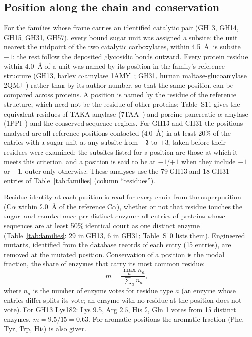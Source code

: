 \documentclass[preprint,12pt]{elsarticle}
\begin{document}
\subsection{Position along the chain and conservation}\label{sec:position}
For the families whose frame carries an identified catalytic pair (GH13, GH14, GH15, GH31, GH57), every bound sugar
unit was assigned a subsite: the unit nearest the midpoint of the two catalytic carboxylates,
within 4.5~\AA, is subsite $-1$; the rest follow the deposited glycosidic bonds outward.
Every protein residue within 4.0~\AA{} of a unit was named by its position in the
family's reference structure (GH13, barley $\alpha$-amylase 1AMY~\citep{Kadziola1994}; GH31, human
maltase-glucoamylase 2QMJ~\citep{Sim2008}) rather than by its author number, so that the same position can be
compared across proteins. A position is named by the residue of the reference structure, which need not be the
residue of other proteins; Table~S11 gives the equivalent residues of TAKA-amylase (7TAA~\citep{Brzozowski1997}) and porcine pancreatic $\alpha$-amylase (1PPI~\citep{Qian1994}) and the conserved sequence regions. For GH13 and GH31 the
positions analysed are all reference positions contacted (4.0~\AA) in at least 20\% of the entries with a sugar unit
at any subsite from $-3$ to $+3$, taken before their residues were examined; the subsites listed for a position are
those at which it meets this criterion, and a position is said to be at $-1$/$+1$ when they include $-1$ or $+1$,
outer-only otherwise. These analyses use the 79 GH13 and 18 GH31 entries of Table~\ref{tab:families} (column ``residues'').

Residue identity at each position is read for every chain from the superposition (C$\alpha$
within 2.0~\AA{} of the reference C$\alpha$), whether or not that residue touches the sugar, and counted once per
distinct enzyme: all entries of proteins whose sequences are at least 50\% identical count as one distinct enzyme (Table~\ref{tab:families}: 29 in GH13, 6 in GH31; Table~S10 lists them). Engineered mutants, identified from the
database records of each entry (15 entries), are removed at the mutated position. Conservation of a position is the modal fraction, the share of enzymes that carry its most common residue:
\begin{equation}
m = \frac{\max_a n_a}{\sum_a n_a},
\label{eq:modal}
\end{equation}
where $n_a$ is the number of enzyme votes for residue type $a$ (an enzyme whose entries differ splits its vote; an enzyme
with no residue at the position does not vote). For GH13 Lys182: Lys 9.5, Arg 2.5, His 2, Gln 1 votes from 15 distinct enzymes, $m =
9.5/15 = 0.63$. For aromatic positions the aromatic fraction (Phe, Tyr, Trp, His) is also given.
\end{document}
